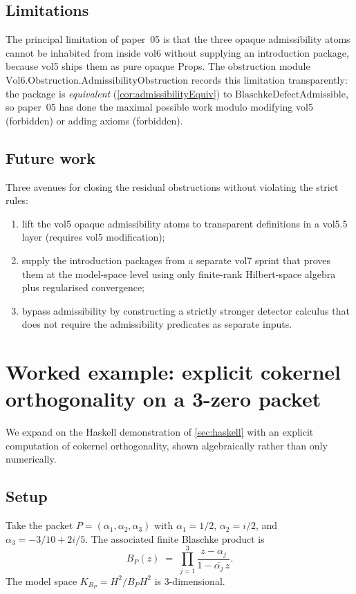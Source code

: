 \documentclass[12pt]{article}
\theoremstyle{definition}
\theoremstyle{remark}
\newcommand{\HardyTwo}{H^{2}}
\newcommand{\KBP}{K_{B_{P}}}
\begin{document}
\subsection{Limitations}

The principal limitation of paper~05 is that the three opaque admissibility atoms cannot be inhabited from inside vol6 without supplying an introduction package, because vol5 ships them as pure opaque Props. The obstruction module $\mathrm{Vol6.Obstruction.AdmissibilityObstruction}$ records this limitation transparently: the package is \emph{equivalent} (\cref{cor:admissibilityEquiv}) to $\mathrm{BlaschkeDefectAdmissible}$, so paper~05 has done the maximal possible work modulo modifying vol5 (forbidden) or adding axioms (forbidden).

\subsection{Future work}

Three avenues for closing the residual obstructions without violating the strict rules:
\begin{enumerate}
  \item lift the vol5 opaque admissibility atoms to transparent definitions in a vol5.5 layer (requires vol5 modification);
  \item supply the introduction packages from a separate vol7 sprint that proves them at the model-space level using only finite-rank Hilbert-space algebra plus regularised convergence;
  \item bypass admissibility by constructing a strictly stronger detector calculus that does not require the admissibility predicates as separate inputs.
\end{enumerate}

\section{Worked example: explicit cokernel orthogonality on a 3-zero packet}\label{sec:workedExample}

We expand on the Haskell demonstration of \cref{sec:haskell} with an explicit computation of cokernel orthogonality, shown algebraically rather than only numerically.

\subsection{Setup}

Take the packet $P = (\alpha_{1}, \alpha_{2}, \alpha_{3})$ with
$\alpha_{1} = 1/2$, $\alpha_{2} = i/2$, and $\alpha_{3} = -3/10 + 2i/5$. The associated finite Blaschke product is
\begin{equation}\label{eq:explicitB}
  B_{P}(z)
  \;=\;
  \prod_{j=1}^{3} \frac{z - \alpha_{j}}{1 - \overline{\alpha_{j}}\, z}.
\end{equation}
The model space $\KBP = \HardyTwo / B_{P} \HardyTwo$ is 3-dimensional.
\end{document}
